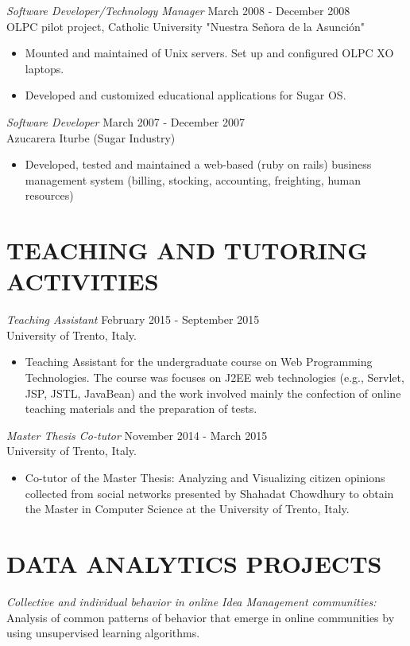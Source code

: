 \documentclass[line,margin]{res}
\begin{document}
\begin{resume}
{\sl Software Developer/Technology Manager} \hfill March 2008 - December 2008 \\
OLPC pilot project, Catholic University "Nuestra Se\~nora de la Asunci\'on" 
\begin{itemize}  \itemsep -2pt %
	\item Mounted and maintained of Unix servers. Set up and configured OLPC XO laptops. 
	\item Developed and customized educational applications for Sugar OS.
\end{itemize} 
     
{\sl Software Developer} \hfill March 2007 - December 2007 \\
Azucarera Iturbe (Sugar Industry)
\begin{itemize}
	\item Developed, tested and maintained a web-based (ruby on rails) business management system (billing, stocking, accounting, freighting, human resources)
\end{itemize} 

\section{TEACHING AND TUTORING ACTIVITIES}
{\sl Teaching Assistant} \hfill February 2015 - September 2015 \\
University of Trento, Italy. 
\begin{itemize}  \itemsep -2pt %
\item Teaching Assistant for the undergraduate course on Web Programming Technologies. The course was focuses on J2EE web technologies (e.g., Servlet, JSP, JSTL, JavaBean) and the work involved mainly the confection of online teaching materials and the preparation of tests.
\end{itemize}
{\sl Master Thesis Co-tutor} \hfill November 2014 - March 2015 \\
University of Trento, Italy.
\begin{itemize}  \itemsep -2pt %
\item Co-tutor of the Master Thesis: Analyzing and Visualizing citizen opinions collected from social networks presented by Shahadat Chowdhury to obtain the Master in Computer Science at the University of Trento, Italy.
\end{itemize}

 
\section{DATA ANALYTICS PROJECTS}
	{\sl Collective and individual behavior in online Idea Management communities:} Analysis of common patterns of behavior that emerge in online communities by using unsupervised learning algorithms.


\end{resume}
\end{document}
